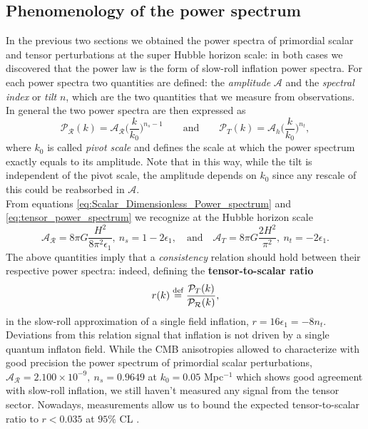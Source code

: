 \subsection{Phenomenology of the power spectrum}\label{sec:primordial_PS}
In the previous two sections we obtained the power spectra of primordial scalar and tensor perturbations at the super Hubble horizon scale: in both cases we discovered that the power law is the form of slow-roll inflation power spectra. For each power spectra two quantities are defined: the \emph{amplitude} $\mathcal A$ and the \emph{spectral index} or \emph{tilt} $n$, which are the two quantities that we measure from observations. In general the two power spectra are then expressed as
\begin{equation}
    \mathcal P_\mathcal{R}(k)=\mathcal{A_R}\bigg(\frac{k}{k_0}\bigg)^{n_s-1}\qquad\text{and}\qquad\mathcal P_T(k)=\mathcal{A}_h\bigg(\frac{k}{k_0}\bigg)^{n_t},
\end{equation}
where $k_0$ is called \emph{pivot scale} and defines the scale at which the power spectrum exactly equals to its amplitude. Note that in this way, while the tilt is independent of the pivot scale, the amplitude depends on $k_0$ since any rescale of this could be reabsorbed in $\mathcal A$.\\ From equations \eqref{eq:Scalar_Dimensionless_Power_spectrum} and \eqref{eq:tensor_power_spectrum} we recognize at the Hubble horizon scale
\begin{equation}
    \mathcal{A_R}=8\pi G\frac{H^2}{8\pi^2\epsilon_1},\ n_s=1-2\epsilon_1,\quad\text{and}\quad\mathcal{A}_T=8\pi G\frac{2H^2}{\pi^2},\ n_t=-2\epsilon_1.
\end{equation}
The above quantities imply that a \emph{consistency} relation should hold between their respective power spectra: indeed, defining the \textbf{tensor-to-scalar ratio}
\begin{equation}
    r(k)\stackrel{\text{def}}{=}\frac{\mathcal{P}_T(k)}{\mathcal{P_R}(k)},
\end{equation} 
in the slow-roll approximation of a single field inflation, $r=16\epsilon_1=-8n_t$. Deviations from this relation signal that inflation is not driven by a single quantum inflaton field. While the CMB anisotropies allowed to characterize with good precision the power spectrum of primordial scalar perturbations, $\mathcal{A_R}=2.100\times 10^{-9},\ n_s=0.9649$ at $k_0=0.05$ Mpc$^{-1}$ \cite{planck2018results} which shows good agreement with slow-roll inflation, we still haven't measured any signal from the tensor sector. Nowadays, measurements allow us to bound the expected tensor-to-scalar ratio to $r<0.035$ at $95\%$ CL \cite{Ade_2021}.

